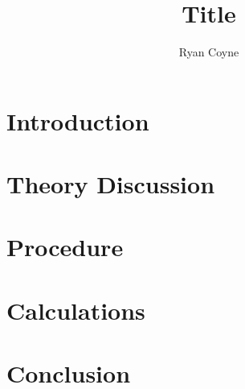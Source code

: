 \documentclass[12pt]{article}
\begin{document}
    \title{Title}
    \author{Ryan Coyne}
    \maketitle
    \section*{Introduction}

    \section*{Theory Discussion}

    \section*{Procedure}

    \section*{Calculations}

    \section*{Conclusion}
\end{document}
